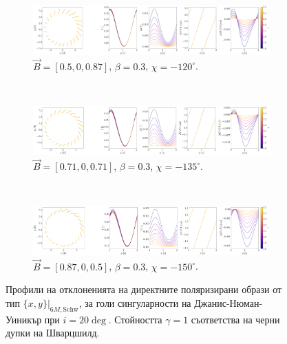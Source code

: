 \begin{figure}[!htb]
	\centering
	\begin{subfigure}{12cm}
		\hspace{-0.25cm}
		\includegraphics[scale = 0.13]{JNW_delta_figs_B_0.5_0.0_0.87_20_deg_direct.png}
		\caption{$\vec{B} = [0.5, 0, 0.87]$, $\beta = 0.3$, $\chi = -120^\circ$.}
	\end{subfigure}\\
	\begin{subfigure}{12cm}
		\hspace{-0.25cm}
		\includegraphics[scale = 0.13]{JNW_delta_figs_B_0.71_0.0_0.71_20_deg_direct.png}
		\caption{$\vec{B} = [0.71, 0, 0.71]$, $\beta = 0.3$, $\chi = -135^\circ$.}
	\end{subfigure}\\
	\begin{subfigure}{12cm}
		\hspace{-0.25cm}
		\includegraphics[scale = 0.13]{JNW_delta_figs_B_0.87_0.0_0.5_20_deg_direct.png}
		\caption{$\vec{B} = [0.87, 0, 0.5]$, $\beta = 0.3$, $\chi = -150^\circ$.}
	\end{subfigure}
	\caption[Профили на отклоненията на директните поляризирани образи oт тип $\{x,y\}\vert_{6M, \text{Schw}}$, за $i = 20\deg$ за голи сингуларности на Джанис-Нюман-Уиникър.]{\small Профили на отклоненията на директните поляризирани образи от тип $\{x,y\}\vert_{6M, \text{Schw}}$, за голи сингуларности на Джанис-Нюман-Уиникър при $i = 20\deg$. Стойността $\gamma = 1$ съответства на черни дупки на Шварцшилд.} 
	\label{JNW_delta_r6_20_deg}
\end{figure}

